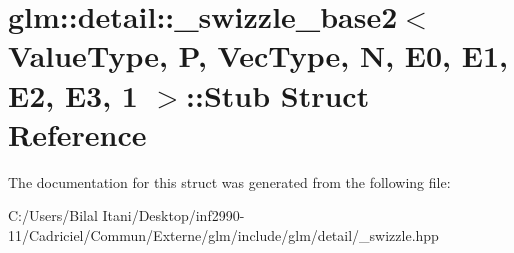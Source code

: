 \hypertarget{structglm_1_1detail_1_1__swizzle__base2_3_01_value_type_00_01_p_00_01_vec_type_00_01_n_00_01_e0_17279995be88bc842083eed40758473c}{}\section{glm\+:\+:detail\+:\+:\+\_\+swizzle\+\_\+base2$<$ Value\+Type, P, Vec\+Type, N, E0, E1, E2, E3, 1 $>$\+:\+:Stub Struct Reference}
\label{structglm_1_1detail_1_1__swizzle__base2_3_01_value_type_00_01_p_00_01_vec_type_00_01_n_00_01_e0_17279995be88bc842083eed40758473c}


The documentation for this struct was generated from the following file\+:\begin{DoxyCompactItemize}
\item 
C\+:/\+Users/\+Bilal Itani/\+Desktop/inf2990-\/11/\+Cadriciel/\+Commun/\+Externe/glm/include/glm/detail/\+\_\+swizzle.\+hpp\end{DoxyCompactItemize}
